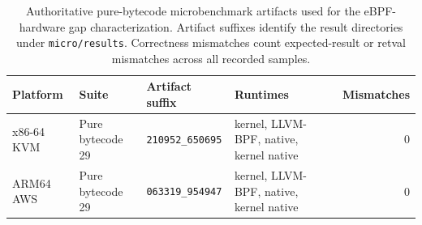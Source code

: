\begin{table}[t]
\centering
\scriptsize
\caption{Authoritative pure-bytecode microbenchmark artifacts used for the eBPF-hardware gap characterization. Artifact suffixes identify the result directories under \texttt{micro/results}. Correctness mismatches count expected-result or retval mismatches across all recorded samples.}
\label{tab:char-micro-artifacts}
\begin{tabular}{@{}llllr@{}}
\toprule
Platform & Suite & Artifact suffix & Runtimes & Mismatches \\
\midrule
x86-64 KVM & Pure bytecode 29 & \texttt{210952\_650695} & kernel, LLVM-BPF, native, kernel native & 0 \\
ARM64 AWS & Pure bytecode 29 & \texttt{063319\_954947} & kernel, LLVM-BPF, native, kernel native & 0 \\
\bottomrule
\end{tabular}
\end{table}
